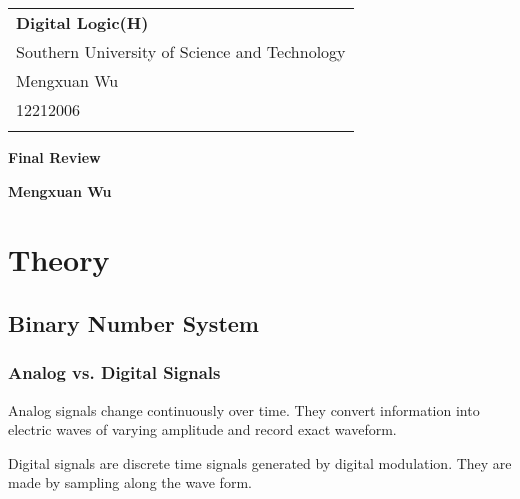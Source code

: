 \documentclass[a4paper,12pt]{article}
\begin{document}
\thispagestyle{empty} %

\begin{tabular}{p{15.5cm}}
{\large \bf Digital Logic(H)} \\
Southern University of Science and Technology \\ Mengxuan Wu \\ 12212006 \\
\hline
\\
\end{tabular}

\vspace*{0.3cm} %

\begin{center}
	{\Large \bf Final Review}
	\vspace{2mm}

	{\bf Mengxuan Wu}
		
\end{center}  

\vspace{0.4cm}

\section{Theory}

\subsection{Binary Number System}

\subsubsection{Analog vs. Digital Signals}

Analog signals change continuously over time. 
They convert information into electric waves of varying amplitude and record exact waveform.

Digital signals are discrete time signals generated by digital modulation. 
They are made by sampling along the wave form.

\begin{center}
\end{center}
\end{document}
